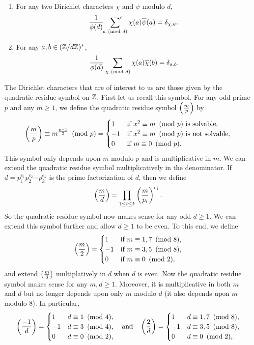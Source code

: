 \documentclass[12pt,reqno,oneside]{amsart}
\begin{document}
    \begin{theorem}
        \phantom{ }
        \begin{enumerate}[label=(\roman*)]
          \item For any two Dirichlet characters $\chi$ and $\psi$ modulo $d$,
          \[
            \frac{1}{\phi(d)}\sideset{}{'}\sum_{a \ \left(\text{mod }d\right)}\chi(a)\overline{\psi}(a) = \delta_{\chi,\psi}.
          \]
          \item For any $a,b \in (\mathbb{Z}/d\mathbb{Z})^{\ast}$,
          \[
            \frac{1}{\phi(d)}\sum_{\chi \ \left(\text{mod }d\right)}\chi(a)\overline{\chi}(b) = \delta_{a,b}.
          \]
        \end{enumerate}
    \end{theorem}

    The Dirichlet characters that are of interest to us are those given by the quadratic residue symbol on $\mathbb{Z}$. First let us recall this symbol. For any odd prime $p$ and any $m \ge 1$, we define the quadratic residue symbol $\textstyle{\left(\frac{m}{p}\right)}$ by
    \[
        \left(\frac{m}{p}\right) \equiv m^{\frac{p-1}{2}} \ \left(\text{mod }p\right) = \begin{cases} 1 & \text{if $x^{2} \equiv m \ \left(\text{mod }p\right)$ is solvable}, \\ -1 & \text{if $x^{2} \equiv m \ \left(\text{mod }p\right)$ is not solvable}, \\ 0 & \text{if $m \equiv 0 \ \left(\text{mod }p\right)$}. \end{cases}
    \]
    This symbol only depends upon $m$ modulo $p$ and is multiplicative in $m$. We can extend the quadratic residue symbol multiplicatively in the denominator. If $d = p_{1}^{e_{1}}p_{2}^{e_{2}} \cdots p_{k}^{e_{k}}$ is the prime factorization of $d$, then we define
    \[
        \left(\frac{m}{d}\right) = \prod_{1 \le i \le k}\left(\frac{m}{p_{i}}\right)^{e_{i}}.
    \]
    So the quadratic residue symbol now makes sense for any odd $d \ge 1$. We can extend this symbol further and allow $d \ge 1$ to be even. To this end, we define
    \[
        \left(\frac{m}{2}\right) = \begin{cases} 1 & \text{if $m \equiv 1,7 \ \left(\text{mod }8\right)$}, \\ -1 & \text{if $m \equiv 3,5 \ \left(\text{mod }8\right)$}, \\ 0 & \text{if $m \equiv 0 \ \left(\text{mod }2\right)$}, \end{cases}
    \]
    and extend $\textstyle{\left(\frac{m}{d}\right)}$ multiplatively in $d$ when $d$ is even. Now the quadratic residue symbol makes sense for any $m,d \ge 1$. Moreover, it is multiplicative in both $m$ and $d$ but no longer depends upon only $m$ modulo $d$ (it also depends upon $m$ modulo $8$). In particular,
    \[
        \left(\frac{-1}{d}\right) = \begin{cases} 1 & \text{$d \equiv 1 \ \left(\text{mod }4\right)$}, \\ -1 & \text{$d \equiv 3 \ \left(\text{mod }4\right)$}, \\ 0 & \text{$d \equiv 0 \ \left(\text{mod }2\right)$}, \end{cases} \quad \text{and} \quad \left(\frac{2}{d}\right) = \begin{cases} 1 & \text{$d \equiv 1,7 \ \left(\text{mod }8\right)$}, \\ -1 & \text{$d \equiv 3,5 \ \left(\text{mod }8\right)$}, \\ 0 & \text{$d \equiv 0 \ \left(\text{mod }2\right)$}, \end{cases}
    \]
\end{document}
